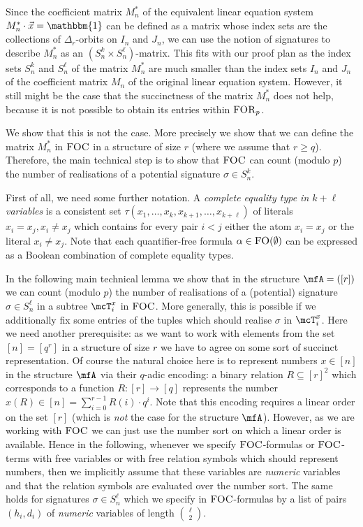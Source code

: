 \documentclass[a4paper,UKenglish]{lipics}
\newcommand{\inseg}[1]{\ensuremath{[#1]}}
\newcommand{\onevec}{\ensuremath{\mathbbm{1}}}
\newcommand{\logic}[1]{\ensuremath{\textsc{#1}}\xspace}
\newcommand{\FO}{\logic{FO}}
\newcommand{\FOC}{\logic{FOC}}
\newcommand{\FORp}{\ensuremath{\logic{FOR}_p}\xspace}
\theoremstyle{plain}
\begin{document}
\medskip
Since the coefficient matrix $M_n^*$ of the equivalent linear 
equation system $M_n^* \cdot \vec x = \onevec$ can be defined 
as a matrix whose index sets are the collections of $\Delta_r$-orbits on 
$I_n$ and $J_n$, we can use the notion of signatures to describe 
$M_n^*$ as an 
$(S_n^k  \times S_n^\ell)$-matrix. This fits with our 
proof plan as the index sets $S_n^k$ and $S_n^\ell$ of the 
matrix $M_n^*$ are much smaller than the  index sets $I_n$ and $J_n$ of the 
coefficient matrix $M_n$ of the original linear equation system.
However, it still might be the case that the succinctness of the 
matrix $M_n^*$ does not help, because it is not possible to obtain its 
entries within $\FORp$.

We show that this is not the case. More precisely we show
that we can define the matrix $M_n^*$ in $\FOC$ in a 
structure of size $r$ (where we assume that $r \geq q$). 
Therefore, the main technical 
step is to show that $\FOC$ can count (modulo $p$) the number of 
realisations of a potential signature $\sigma \in S_n^k$.

\medskip
First of all, we need some further notation. A \emph{complete equality 
type in $k+\ell$ variables}  is a consistent set $\tau(x_1, \dots, x_k, 
x_{k+1}, \dots, x_{k+\ell})$ of literals $x_i = x_j, x_i \neq x_j$
which contains for every pair $i < j$ either the atom $x_i = x_j$ or the literal
$x_i \neq x_j$. Note that each quantifier-free formula $\alpha \in 
\FO(\emptyset)$ can be 
expressed as a Boolean combination of complete equality types.

In the following main technical lemma we show that in the structure $\mfA = 
(\inseg{ r})$ we can count (modulo $p$) the number of 
realisations of a (potential) signature $\sigma \in S_n^\ell$ in a 
subtree $\mcT_i^x$ in $\FOC$. More generally, this is possible  if 
we additionally 
fix some entries of the tuples which should realise $\sigma$ in 
$\mcT_i^x$.
Here we need another prerequisite: as we want to work with elements 
from the set $\inseg n = \inseg {q^r}$ in a structure of size $r$ we have to 
agree on some sort of succinct representation. 
Of course the natural choice here is 
to represent numbers $x \in \inseg n$ in the structure $\mfA$ via their 
$q$-adic encoding: a binary relation $R \subseteq 
\inseg{r}^2$ which corresponds to a function $R: \inseg{r} \to \inseg{q}$ 
represents the number $x(R) \in \inseg{n} = \sum_{i=0}^{r-1} R(i) \cdot 
q^i$. Note that this encoding requires a linear order on the set $\inseg r$ 
(which is \emph{not} the case for the 
structure $\mfA$). However, as we are working with $\FOC$ we can just use the 
number sort on which a linear order is available.
Hence in the following, whenever we specify $\FOC$-formulas or $\FOC$-terms 
with free variables or with free relation symbols which should represent 
numbers, then we implicitly assume that these variables are \emph{numeric} 
variables and that the relation symbols are evaluated over the number 
sort. The same holds for signatures $\sigma \in S_n^\ell$ which we specify 
in $\FOC$-formulas by a list of pairs $(h_i, d_i)$ of \emph{numeric} 
variables  of length $\ell \choose 2$.
\end{document}
